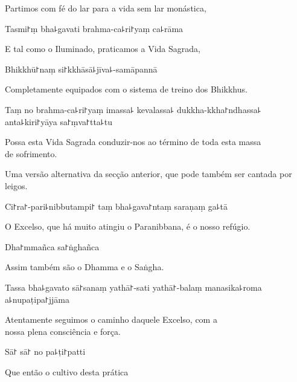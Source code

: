 \begin{english}
  Partimos com fé do lar para a vida sem lar monástica,
\end{english}

Tasmi꜓ṃ bha꜕gavati brahma-ca꜕ri꜓yaṃ ca꜕rāma

\begin{english}
  E tal como o Iluminado, praticamos a Vida Sagrada, 
\end{english}

Bhikkhū꜓naṃ si꜓kkhāsā꜕jīva꜕-samāpannā

\begin{english}
  Completamente equipados com o sistema de treino dos Bhikkhus.
\end{english}

Taṃ no brahma-ca꜕ri꜓yaṃ imassa꜕ kevalassa꜕ dukkha-kkha꜓ndhassa꜕ anta꜕kiri꜓yāya sa꜓ṃva꜓tta꜕tu

\begin{english}
  Possa esta Vida Sagrada conduzir-nos ao término de toda esta massa\\  de sofrimento.
\end{english}

\begin{instruction}
  Uma versão alternativa da secção anterior, que pode também ser cantada por leigos.
\end{instruction}

Ci꜓ra꜓-pari꜕nibbutampi꜓ taṃ bha꜕gava꜓ntaṃ saraṇaṃ ga꜕tā

\begin{english}
  O Excelso, que há muito atingiu o Paranibbana, é o nosso refúgio.
\end{english}

Dha꜓mmañca sa꜓ṅghañca

\begin{english}
  Assim também são o Dhamma e o Saṅgha.
\end{english}

Tassa bha꜕gavato sā꜓sanaṃ yathā꜓-sati yathā꜓-balaṃ manasika꜕roma a꜕nupaṭipa꜓jjāma

\begin{english}
  Atentamente seguimos o caminho daquele Excelso, com  a \\nossa plena consciência e força.
\end{english}

Sā꜓ sā꜓ no pa꜕ṭi꜓patti

\begin{english}
  Que então o cultivo desta prática
\end{english}

